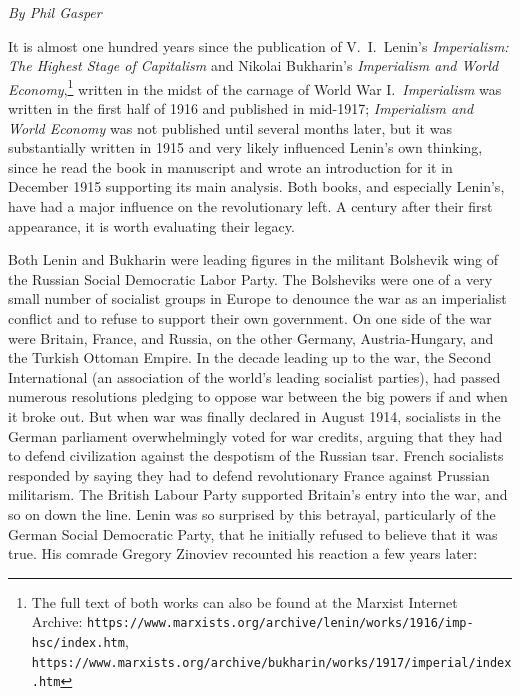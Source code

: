 \emph{By Phil Gasper}

It is almost one hundred years since the publication of V.\ I.\ Lenin's \emph{Imperialism: The Highest Stage of Capitalism} and Nikolai Bukharin's \emph{Imperialism and World Economy},\footnote{The full text of both works can also be found at the Marxist Internet Archive: \texttt{https://www.marxists.org/archive/lenin/works/1916/imp-hsc/index.htm}, \texttt{https://www.marxists.org/archive/bukharin/works/1917/imperial/index.htm}} written in the midst of the carnage of World War I.\ \emph{Imperialism} was written in the first half of 1916 and published in mid-1917; \emph{Imperialism and World Economy} was not published until several months later, but it was substantially written in 1915 and very likely influenced Lenin's own thinking, since he read the book in manuscript and wrote an introduction for it in December 1915 supporting its main analysis. Both books, and especially Lenin's, have had a major influence on the revolutionary left. A century after their first appearance, it is worth evaluating their legacy.

Both Lenin and Bukharin were leading figures in the militant Bolshevik wing of the Russian Social Democratic Labor Party. The Bolsheviks were one of a very small number of socialist groups in Europe to denounce the war as an imperialist conflict and to refuse to support their own government. On one side of the war were Britain, France, and Russia, on the other Germany, Austria-Hungary, and the Turkish Ottoman Empire. In the decade leading up to the war, the Second International (an association of the world's leading socialist parties), had passed numerous resolutions pledging to oppose war between the big powers if and when it broke out. But when war was finally declared in August 1914, socialists in the German parliament overwhelmingly voted for war credits, arguing that they had to defend civilization against the despotism of the Russian tsar. French socialists responded by saying they had to defend revolutionary France against Prussian militarism. The British Labour Party supported Britain's entry into the war, and so on down the line. Lenin was so surprised by this betrayal, particularly of the German Social Democratic Party, that he initially refused to believe that it was true. His comrade Gregory Zinoviev recounted his reaction a few years later:

